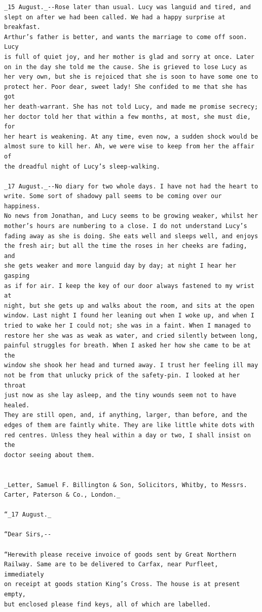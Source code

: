 \documentclass{article}
\begin{document}
\begin{verbatim}
_15 August._--Rose later than usual. Lucy was languid and tired, and
slept on after we had been called. We had a happy surprise at breakfast.
Arthur’s father is better, and wants the marriage to come off soon. Lucy
is full of quiet joy, and her mother is glad and sorry at once. Later
on in the day she told me the cause. She is grieved to lose Lucy as
her very own, but she is rejoiced that she is soon to have some one to
protect her. Poor dear, sweet lady! She confided to me that she has got
her death-warrant. She has not told Lucy, and made me promise secrecy;
her doctor told her that within a few months, at most, she must die, for
her heart is weakening. At any time, even now, a sudden shock would be
almost sure to kill her. Ah, we were wise to keep from her the affair of
the dreadful night of Lucy’s sleep-walking.

_17 August._--No diary for two whole days. I have not had the heart to
write. Some sort of shadowy pall seems to be coming over our happiness.
No news from Jonathan, and Lucy seems to be growing weaker, whilst her
mother’s hours are numbering to a close. I do not understand Lucy’s
fading away as she is doing. She eats well and sleeps well, and enjoys
the fresh air; but all the time the roses in her cheeks are fading, and
she gets weaker and more languid day by day; at night I hear her gasping
as if for air. I keep the key of our door always fastened to my wrist at
night, but she gets up and walks about the room, and sits at the open
window. Last night I found her leaning out when I woke up, and when I
tried to wake her I could not; she was in a faint. When I managed to
restore her she was as weak as water, and cried silently between long,
painful struggles for breath. When I asked her how she came to be at the
window she shook her head and turned away. I trust her feeling ill may
not be from that unlucky prick of the safety-pin. I looked at her throat
just now as she lay asleep, and the tiny wounds seem not to have healed.
They are still open, and, if anything, larger, than before, and the
edges of them are faintly white. They are like little white dots with
red centres. Unless they heal within a day or two, I shall insist on the
doctor seeing about them.


_Letter, Samuel F. Billington & Son, Solicitors, Whitby, to Messrs.
Carter, Paterson & Co., London._

“_17 August._

“Dear Sirs,--

“Herewith please receive invoice of goods sent by Great Northern
Railway. Same are to be delivered to Carfax, near Purfleet, immediately
on receipt at goods station King’s Cross. The house is at present empty,
but enclosed please find keys, all of which are labelled.


\end{verbatim}
\end{document}
